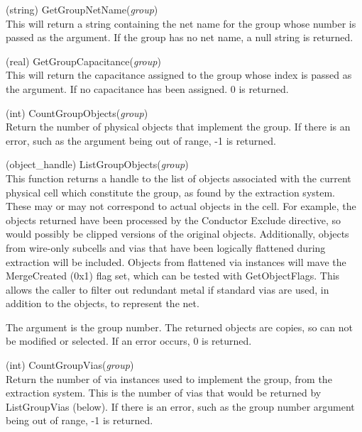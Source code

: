 \begin{description}
\item{(string) \vt GetGroupNetName({\it group\/})}\\
This will return a string containing the net name for the group whose
number is passed as the argument.  If the group has no net name, a
null string is returned.

\item{(real) \vt GetGroupCapacitance({\it group\/})}\\
This will return the capacitance assigned to the group whose index is
passed as the argument.  If no capacitance has been assigned.  0 is
returned.

\item{(int) \vt CountGroupObjects({\it group\/})}\\
Return the number of physical objects that implement the group.  If
there is an error, such as the argument being out of range, -1 is
returned.

\item{(object\_handle) \vt ListGroupObjects({\it group\/})}\\
This function returns a handle to the list of objects associated with
the current physical cell which constitute the group, as found by the
extraction system.  These may or may not correspond to actual objects
in the cell.  For example, the objects returned have been processed by
the {\vt Conductor Exclude} directive, so would possibly be clipped
versions of the original objects.  Additionally, objects from
wire-only subcells and vias that have been logically flattened during
extraction will be included.  Objects from flattened via instances
will mave the {\vt MergeCreated} ({\vt 0x1}) flag set, which can be
tested with {\vt GetObjectFlags}.  This allows the caller to filter
out redundant metal if standard vias are used, in addition to the
objects, to represent the net.

The argument is the group number.  The returned objects are copies, so
can not be modified or selected.  If an error occurs, 0 is returned.

\item{(int) \vt CountGroupVias({\it group\/})}\\
Return the number of via instances used to implement the group, from
the extraction system.  This is the number of vias that would be
returned by {\vt ListGroupVias} (below).  If there is an error, such
as the group number argument being out of range, -1 is returned.


\end{description}

